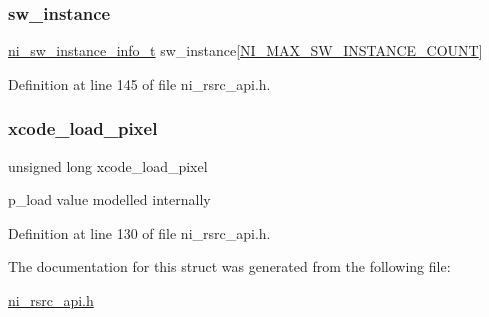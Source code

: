 \subsubsection{\texorpdfstring{sw\_instance}{sw\_instance}}
{\footnotesize\ttfamily \mbox{\hyperlink{ni__rsrc__api_8h_a9e007bba8915f56c2a096715a4edf473}{ni\+\_\+sw\+\_\+instance\+\_\+info\+\_\+t}} sw\+\_\+instance\mbox{[}\mbox{\hyperlink{ni__rsrc__api_8h_a573b669de80ab750cfc3d96da9dbd507}{N\+I\+\_\+\+M\+A\+X\+\_\+\+S\+W\+\_\+\+I\+N\+S\+T\+A\+N\+C\+E\+\_\+\+C\+O\+U\+NT}}\mbox{]}}



Definition at line 145 of file ni\+\_\+rsrc\+\_\+api.\+h.

\mbox{\label{struct__ni__device__info_af7b563c1eb04ef61577e64a7319c1a77}} 
\subsubsection{\texorpdfstring{xcode\_load\_pixel}{xcode\_load\_pixel}}
{\footnotesize\ttfamily unsigned long xcode\+\_\+load\+\_\+pixel}

p\+\_\+load value modelled internally 

Definition at line 130 of file ni\+\_\+rsrc\+\_\+api.\+h.



The documentation for this struct was generated from the following file\+:\begin{DoxyCompactItemize}
\item 
\mbox{\hyperlink{ni__rsrc__api_8h}{ni\+\_\+rsrc\+\_\+api.\+h}}\end{DoxyCompactItemize}

